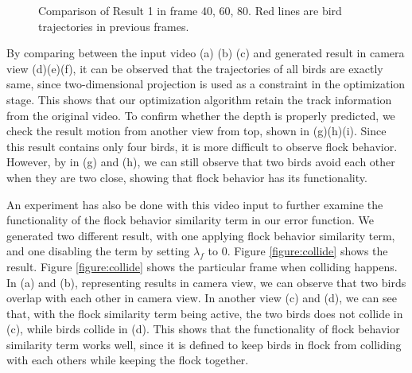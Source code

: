 \begin{figure}[h]
\begin{center}
\hspace{\fill}
\hspace{\fill}


\hspace{\fill}
\hspace{\fill}


\hspace{\fill}
\hspace{\fill}
\end{center}
\caption{Comparison of Result 1 in frame 40, 60, 80. Red lines are bird trajectories in previous frames. }
\label{figure:result1_com}
\end{figure}


By comparing between the input video (a) (b) (c) and generated result in camera view (d)(e)(f), it can be observed that the trajectories of all birds are exactly same, since two-dimensional projection is used as a constraint in the optimization stage. This shows that our optimization algorithm retain the track information from the original video. To confirm whether the depth is properly predicted, we check the result motion from another view from top, shown in (g)(h)(i). Since this result contains only four birds, it is more difficult to observe flock behavior. However, by in (g) and (h), we can still observe that two birds avoid each other when they are two close, showing that flock behavior has its functionality.


An experiment has also be done with this video input to further examine the functionality of the flock behavior similarity term in our error function. We generated two different result, with one applying flock behavior similarity term, and one disabling the term by setting $\lambda_{f}$ to 0. Figure \ref{figure:collide} shows the result. Figure \ref{figure:collide} shows the particular frame when colliding happens. In (a) and (b), representing results in camera view, we can observe that two birds overlap with each other in camera view. In another view (c) and (d), we can see that, with the flock similarity term being active, the two birds does not collide in (c), while birds collide in (d). This shows that the functionality of flock behavior similarity term works well, since it is defined to keep birds in flock from colliding with each others while keeping the flock together.


